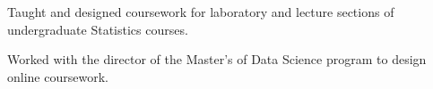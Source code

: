 \documentclass[letterpaper]{deedy-resume} %
\begin{document}
\begin{minipage}[t]{0.65\textwidth}

\hfill{}
\hfill{}
\begin{tightitemize}
\item Taught and designed coursework for laboratory and
  lecture sections of undergraduate Statistics courses.
\item Worked with the director of the Master's of Data Science program
  to design online coursework.
\end{tightitemize}


\end{minipage} %
\end{document}
